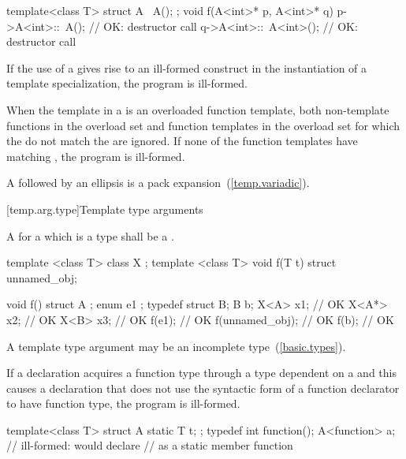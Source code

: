 \begin{codeblock}
template<class T> struct A {
  ~A();
};
void f(A<int>* p, A<int>* q) {
  p->A<int>::~A();              // OK: destructor call
  q->A<int>::~A<int>();         // OK: destructor call
}
\end{codeblock}
\exitexample

\pnum
If the use of a
gives rise to an ill-formed construct in the instantiation of a
template specialization, the program is ill-formed.

\pnum
When the template in a
is an overloaded function template, both non-template functions in the overload
set and function templates in the overload set for
which the
do not match the
are ignored.
If none of the function templates have matching
,
the program is ill-formed.

\pnum
A  followed by an ellipsis is
a pack expansion~(\ref{temp.variadic}).

[temp.arg.type]{Template type arguments}

\pnum
A
for a
which is a type
shall be a
.

\pnum
\enterexample
\begin{codeblock}
template <class T> class X { };
template <class T> void f(T t) { }
struct { } unnamed_obj;

void f() {
  struct A { };
  enum { e1 };
  typedef struct { } B;
  B b;
  X<A> x1;          // OK
  X<A*> x2;         // OK
  X<B> x3;          // OK
  f(e1);            // OK
  f(unnamed_obj);   // OK
  f(b);             // OK
}
\end{codeblock}
\exitexample
\enternote
A template type argument may be an incomplete type~(\ref{basic.types}).
\exitnote

\pnum
If a declaration acquires a function type through a type dependent on a
and this causes a declaration that does not use the
syntactic form of a function declarator to have function type,
the program is ill-formed.
\enterexample

\begin{codeblock}
template<class T> struct A {
  static T t;
};
typedef int function();
A<function> a;                  // ill-formed: would declare 
                                // as a static member function
\end{codeblock}
\exitexample

